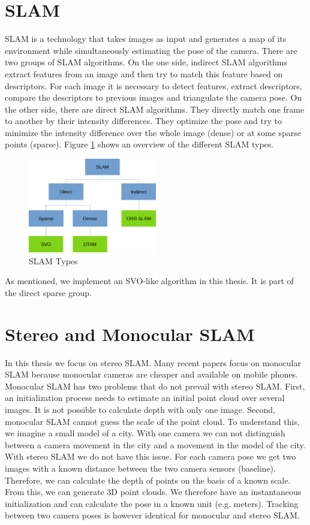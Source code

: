 \documentclass[11pt,a4paper,titlepage,oneside]{report}
\begin{document}
\section{SLAM}

SLAM is a technology that takes images as input and generates a map of its environment while simultaneously estimating the pose of the camera. There are two groups of SLAM algorithms. On the one side, indirect SLAM algorithms extract features from an image and then try to match this feature based on descriptors. For each image it is necessary to detect features, extract descriptors, compare the descriptors to previous images and triangulate the camera pose. On the other side, there are direct SLAM algorithms. They directly match one frame to another by their intensity differences. They optimize the pose and try to minimize the intensity difference over the whole image (dense) or at some sparse points (sparse). Figure \ref{fig:slammodes} shows an overview of the different SLAM types.

\begin{figure}[H]
  \centering
  \includegraphics[width=0.5\textwidth]{img/slam_modes.png}
  \caption{SLAM Types}\label{fig:slammodes}
\end{figure}

As mentioned, we implement an SVO-like algorithm in this thesis. It is part of the direct sparse group.

\section{Stereo and Monocular SLAM}

In this thesis we focus on stereo SLAM. Many recent papers focus on monocular SLAM because monocular cameras are cheaper and available on mobile phones. Monocular SLAM has two problems that do not prevail with stereo SLAM. First, an initialization process needs to estimate an initial point cloud over several images. It is not possible to calculate depth with only one image. Second, monocular SLAM cannot guess the scale of the point cloud. To understand this, we imagine a small model of a city. With one camera we can not distinguish between a camera movement in the city and a movement in the model of the city. With stereo SLAM we do not have this issue. For each camera pose we get two images with a known distance between the two camera sensors (baseline). Therefore, we can calculate the depth of points on the basis of a known scale. From this, we can generate 3D point clouds. We therefore have an instantaneous initialization and can calculate the pose in a known unit (e.g. meters). Tracking between two camera poses is however identical for monocular and stereo SLAM.
\end{document}
